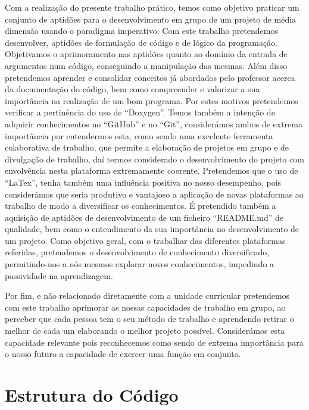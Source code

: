 \documentclass[a4wide]{report}
\begin{document}
Com a realização do presente trabalho prático, temos como objetivo praticar um conjunto de aptidões para o desenvolvimento em grupo de um projeto de média dimensão usando o paradigma imperativo. Com este trabalho pretendemos desenvolver, aptidões de formulação de código e de lógico da programação. Objetivamos o aprimoramento nas aptidões quanto ao domínio da entrada de argumentos num código, conseguindo a manipulação das mesmas. Além disso pretendemos aprender e consolidar conceitos já abordados pelo professor acerca da documentação do código, bem como compreender e valorizar a sua importância na realização de um bom programa. Por estes motivos pretendemos verificar a pertinência do uso de “Doxygen”. Temos também a intenção de adquirir conhecimentos no “GitHub” e no “Git”, considerámos ambos de extrema importância por entendermos esta, como sendo uma excelente ferramenta colaborativa de trabalho, que permite a elaboração de projetos em grupo e de divulgação de trabalho, daí termos considerado o desenvolvimento do projeto com envolvência nesta plataforma extremamente coerente. Pretendemos que o uso de “LaTex”, tenha também uma influência positiva no nosso desempenho, pois considerámos que seria produtivo e vantajoso a aplicação de novas plataformas ao trabalho de modo a diversificar os conhecimentos. É pretendido também a aquisição de aptidões de desenvolvimento de um ficheiro “README.md” de qualidade, bem como o entendimento da sua importância no desenvolvimento de um projeto. Como objetivo geral, com o trabalhar das diferentes plataformas referidas, pretendemos o desenvolvimento de conhecimento diversificado, permitindo-nos a nós mesmos explorar novos conhecimentos, impedindo a passividade na aprendizagem.

Por fim, e não relacionado diretamente com a unidade curricular pretendemos com este trabalho aprimorar as nossas capacidades de trabalho em grupo, ao perceber que cada pessoa tem o seu método de trabalho e aprendendo retirar o melhor de cada um elaborando o melhor projeto possível. Considerámos esta capacidade relevante pois reconhecemos como sendo de extrema importância para o nosso futuro a capacidade de exercer uma função em conjunto.

\newpage
\chapter{Estrutura do Código}
\end{document}
